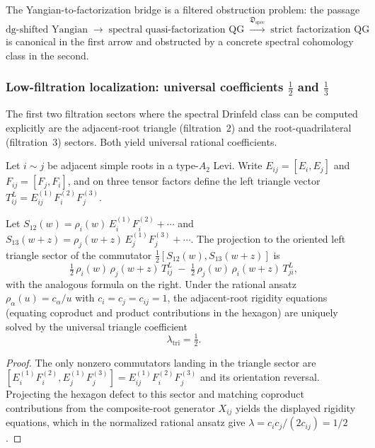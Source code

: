 The Yangian-to-factorization bridge is a filtered obstruction problem: the passage
\[
 \text{dg-shifted Yangian}
 \;\longrightarrow\;
 \text{spectral quasi-factorization QG}
 \;\overset{\mathfrak{D}_{\mathrm{spec}}}{\longrightarrow}\;
 \text{strict factorization QG}
\]
is canonical in the first arrow and obstructed by a concrete
spectral cohomology class in the second.

\subsubsection{Low-filtration localization: universal
coefficients $\frac{1}{2}$ and $\frac{1}{3}$}

The first two filtration sectors where the spectral Drinfeld
class can be computed explicitly are the adjacent-root triangle
(filtration~$2$) and the root-quadrilateral (filtration~$3$)
sectors. Both yield universal rational coefficients.

Let $i \sim j$ be adjacent simple roots in a type-$A_2$ Levi.
Write $E_{ij} = [E_i, E_j]$ and $F_{ij} = [F_j, F_i]$, and
on three tensor factors define the left triangle vector
$T_{ij}^L = E_{ij}^{(1)} F_i^{(2)} F_j^{(3)}$.

\begin{theorem}
\label{thm:spectral-triangle-localization}
Let
$S_{12}(w) = \rho_i(w)\,E_i^{(1)}F_i^{(2)} + \cdots$ and
$S_{13}(w+z) = \rho_j(w+z)\,E_j^{(1)}F_j^{(3)} + \cdots$.
The projection to the oriented left triangle sector of the
commutator $\frac{1}{2}[S_{12}(w), S_{13}(w+z)]$ is
\[
 \tfrac{1}{2}\,\rho_i(w)\,\rho_j(w+z)\,T_{ij}^L
 \;-\;
 \tfrac{1}{2}\,\rho_j(w)\,\rho_i(w+z)\,T_{ji}^L,
\]
with the analogous formula on the right. Under the rational
ansatz $\rho_\alpha(u) = c_\alpha/u$ with
$c_i = c_j = c_{ij} = 1$, the adjacent-root rigidity equations
\textup{(}equating coproduct and product contributions in the
hexagon\textup{)} are uniquely solved by the universal triangle
coefficient
\[
 \boxed{\;\lambda_{\mathrm{tri}} = \tfrac{1}{2}.\;}
\]
\end{theorem}

\begin{proof}
The only nonzero commutators landing in the triangle sector
are $[E_i^{(1)}F_i^{(2)}, E_j^{(1)}F_j^{(3)}] =
E_{ij}^{(1)}F_i^{(2)}F_j^{(3)}$ and its orientation reversal.
Projecting the hexagon defect to this sector and matching
coproduct contributions from the composite-root generator
$X_{ij}$ yields the displayed rigidity equations, which in the
normalized rational ansatz give $\lambda = c_i c_j / (2 c_{ij})
= 1/2$.
\end{proof}


